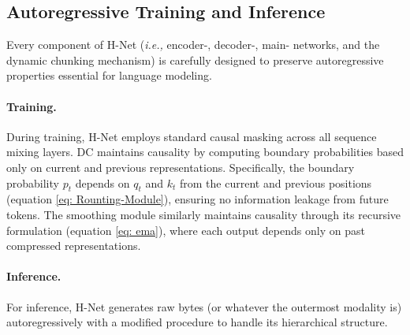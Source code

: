 \documentclass{article}
\newcommand{\model}{H-Net}
\newcommand{\smoother}{smoothing module}
\newcommand{\ie}{\emph{i.e.,}}
\theoremstyle{plain}
\theoremstyle{remark}
\begin{document}
\subsection{Autoregressive Training and Inference}
\label{sec: Method-Autoregressive-Training-and-Inference}
Every component of \model{} (\ie{} encoder-, decoder-, main- networks, and the dynamic chunking mechanism) is carefully designed to preserve autoregressive properties essential for language modeling.

\paragraph{Training.}
During training, \model{} employs standard causal masking across all sequence mixing layers.
DC maintains causality by computing boundary probabilities based only on current and previous representations.
Specifically, the boundary probability $p_t$ depends on $q_t$ and $k_t$ from the current and previous positions (equation \eqref{eq: Rounting-Module}), ensuring no information leakage from future tokens.
The \smoother{} similarly maintains causality through its recursive formulation (equation \eqref{eq: ema}), where each output depends only on past compressed representations.

\paragraph{Inference.}
For inference, \model{} generates raw bytes (or whatever the outermost modality is) autoregressively with a modified procedure to handle its hierarchical structure.
\end{document}
